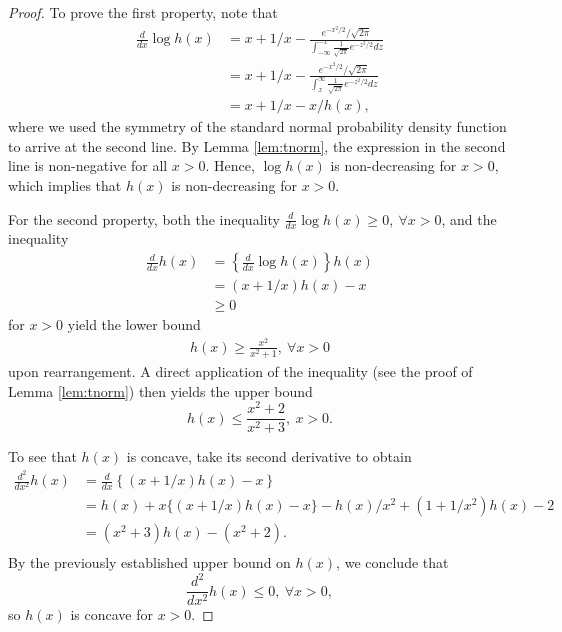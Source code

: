 \documentclass[12pt]{article}
\begin{document}
\begin{proof}
To prove the first property, note that
\begin{equation*}
\begin{aligned}
    \frac{d}{dx} \log h(x) &= x + 1/x - \frac{e^{-x^2/2}/\sqrt{2\pi}}{\int_{-\infty}^{-x} \frac{1}{\sqrt{2 \pi}} e^{-z^2/2}dz} \\
    &= x + 1/x - \frac{e^{-x^2/2}/\sqrt{2\pi}}{\int_{x}^{\infty} \frac{1}{\sqrt{2 \pi}} e^{-z^2/2}dz} \\
    &= x + 1/x - x/h(x),
 \end{aligned}   
\end{equation*}
where we used the symmetry of the standard normal probability density function to arrive at the second line. By Lemma \ref{lem:tnorm}, the expression in the second line is non-negative for all $x > 0$. Hence, $\log h(x)$ is non-decreasing for $x >0$, which implies that $h(x)$ is non-decreasing for $x > 0$.

For the second property, both the inequality $\frac{d}{dx} \log h(x) \geq 0,~\forall x>0$, and the inequality
\begin{equation*}
\begin{aligned}
    \frac{d}{dx} h(x) &= \left\{\frac{d}{dx} \log h(x)\right\} h(x) \\
    &= (x+1/x)h(x) - x \\
    &\geq 0
\end{aligned}
\end{equation*}
for $x > 0$ yield the lower bound
\begin{equation*}
    \begin{aligned}
        h(x) \geq \frac{x^2}{x^2+1},~\forall x> 0
    \end{aligned}
\end{equation*}
upon rearrangement. A direct application of the \cite{peric_class_2019} inequality (see the proof of Lemma \ref{lem:tnorm}) then yields the upper bound
\begin{equation*}
    h(x) \leq \frac{x^2+2}{x^2+3},~x>0.
\end{equation*}

To see that $h(x)$ is concave, take its second derivative to obtain
\begin{equation*}
    \begin{aligned}
        \frac{d^2}{dx^2} h(x) &= \frac{d}{dx} \left\{ (x+1/x)h(x) - x \right\} \\
        &= h(x) + x\{(x + 1/x)h(x) - x\} - h(x)/x^2 + (1 + 1/x^2)h(x) - 2 \\
        &= (x^2+3) h(x) - (x^2  + 2). \\
    \end{aligned}
\end{equation*}
By the previously established upper bound on $h(x)$, we conclude that
\begin{equation*}
    \frac{d^2}{dx^2} h(x) \leq 0,~\forall x>0,
\end{equation*}
so $h(x)$ is concave for $x > 0$.


\end{proof}
\end{document}
